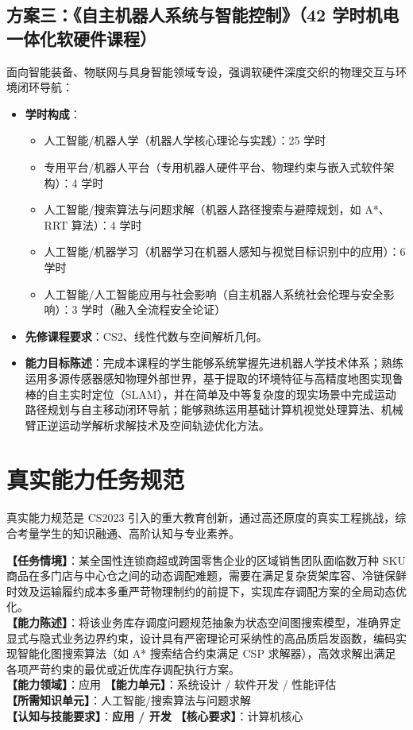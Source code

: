 \subsection{方案三：《自主机器人系统与智能控制》（42 学时机电一体化软硬件课程）}
面向智能装备、物联网与具身智能领域专设，强调软硬件深度交织的物理交互与环境闭环导航：
\begin{itemize}
    \item \textbf{学时构成}：
    \begin{itemize}
        \item 人工智能/机器人学（机器人学核心理论与实践）：25 学时
        \item 专用平台/机器人平台（专用机器人硬件平台、物理约束与嵌入式软件架构）：4 学时
        \item 人工智能/搜索算法与问题求解（机器人路径搜索与避障规划，如 A*、RRT 算法）：4 学时
        \item 人工智能/机器学习（机器学习在机器人感知与视觉目标识别中的应用）：6 学时
        \item 人工智能/人工智能应用与社会影响（自主机器人系统社会伦理与安全影响）：3 学时（融入全流程安全论证）
    \end{itemize}
    \item \textbf{先修课程要求}：CS2、线性代数与空间解析几何。
    \item \textbf{能力目标陈述}：完成本课程的学生能够系统掌握先进机器人学技术体系；熟练运用多源传感器感知物理外部世界，基于提取的环境特征与高精度地图实现鲁棒的自主实时定位（SLAM），并在简单及中等复杂度的现实场景中完成运动路径规划与自主移动闭环导航；能够熟练运用基础计算机视觉处理算法、机械臂正逆运动学解析求解技术及空间轨迹优化方法。
\end{itemize}

\section{真实能力任务规范}

真实能力规范是 CS2023 引入的重大教育创新，通过高还原度的真实工程挑战，综合考量学生的知识融通、高阶认知与专业素养。

\begin{taskbox}[任务 1：销售库存智能优化决策工具]
\textbf{【任务情境】}：某全国性连锁商超或跨国零售企业的区域销售团队面临数万种 SKU 商品在多门店与中心仓之间的动态调配难题，需要在满足复杂货架库容、冷链保鲜时效及运输履约成本多重严苛物理制约的前提下，实现库存调配方案的全局动态优化。\\
\textbf{【能力陈述】}：将该业务库存调度问题规范抽象为状态空间图搜索模型，准确界定显式与隐式业务边界约束，设计具有严密理论可采纳性的高品质启发函数，编码实现智能化图搜索算法（如 A* 搜索结合约束满足 CSP 求解器），高效求解出满足各项严苛约束的最优或近优库存调配执行方案。\\
\textbf{【能力领域】}：应用 \quad \textbf{【能力单元】}：系统设计 / 软件开发 / 性能评估\\
\textbf{【所需知识单元】}：人工智能/搜索算法与问题求解\\
\textbf{【认知与技能要求】}：\textbf{应用 / 开发} \quad \textbf{【核心要求】}：计算机核心
\end{taskbox}

